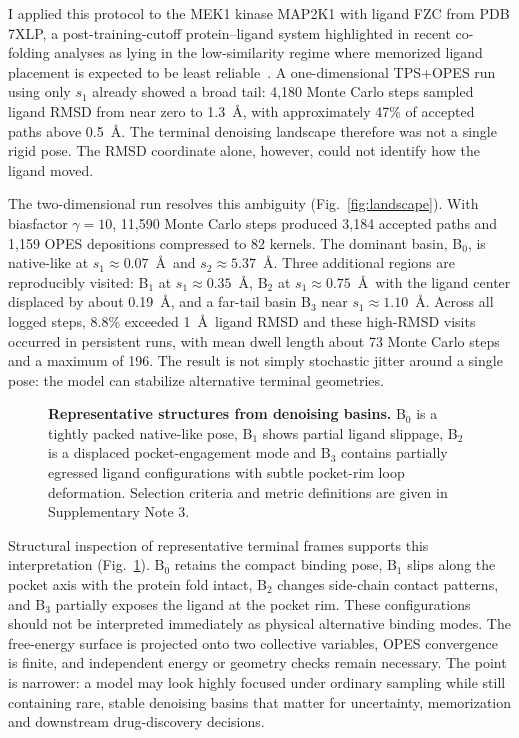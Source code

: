 \documentclass[aps,prl,twocolumn,superscriptaddress,floatfix]{revtex4-2}
\begin{document}
I applied this protocol to the MEK1 kinase MAP2K1 with ligand FZC from PDB
7XLP, a post-training-cutoff protein--ligand system highlighted in recent
co-folding analyses as lying in the low-similarity regime where memorized
ligand placement is expected to be least reliable~\cite{masters2024}. A
one-dimensional TPS+OPES run using only $s_1$ already showed a broad tail:
4,180 Monte Carlo steps sampled ligand RMSD from near zero to 1.3~\AA, with
approximately 47\% of accepted paths above 0.5~\AA. The terminal denoising
landscape therefore was not a single rigid pose. The RMSD coordinate alone,
however, could not identify how the ligand moved.

The two-dimensional run resolves this ambiguity (Fig.~\ref{fig:landscape}).
With biasfactor $\gamma=10$, 11,590 Monte Carlo steps produced 3,184 accepted
paths and 1,159 OPES depositions compressed to 82 kernels. The dominant basin,
B$_0$, is native-like at $s_1 \approx 0.07$~\AA\ and
$s_2 \approx 5.37$~\AA. Three additional regions are reproducibly visited:
B$_1$ at $s_1 \approx 0.35$~\AA, B$_2$ at
$s_1 \approx 0.75$~\AA\ with the ligand center displaced by about
0.19~\AA, and a far-tail basin B$_3$ near $s_1 \approx 1.10$~\AA. Across all
logged steps, 8.8\% exceeded 1~\AA\ ligand RMSD and these high-RMSD visits
occurred in persistent runs, with mean dwell length about 73 Monte Carlo steps
and a maximum of 196. The result is not simply stochastic jitter around a
single pose: the model can stabilize alternative terminal geometries.

\begin{figure}[t]
\centering
{}
\caption{\textbf{Representative structures from denoising basins.}
B$_0$ is a tightly packed native-like pose, B$_1$ shows partial ligand slippage,
B$_2$ is a displaced pocket-engagement mode and B$_3$ contains partially
egressed ligand configurations with subtle pocket-rim loop deformation.
Selection criteria and metric definitions are given in Supplementary Note 3.}
\label{fig:basins}
\end{figure}

Structural inspection of representative terminal frames supports this
interpretation (Fig.~\ref{fig:basins}). B$_0$ retains the compact binding pose,
B$_1$ slips along the pocket axis with the protein fold intact, B$_2$ changes
side-chain contact patterns, and B$_3$ partially exposes the ligand at the
pocket rim. These configurations should not be interpreted immediately as
physical alternative binding modes. The free-energy surface is projected onto
two collective variables, OPES convergence is finite, and independent energy or
geometry checks remain necessary. The point is narrower: a model may look
highly focused under ordinary sampling while still containing rare, stable
denoising basins that matter for uncertainty, memorization and downstream
drug-discovery decisions.
\end{document}
